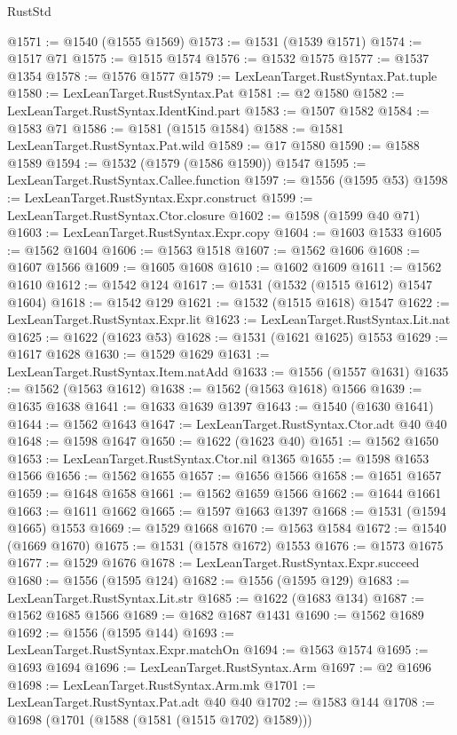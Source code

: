 \begin{lexlean}{RustStd}
\begin{coremodule}
@1571 := @1540 (@1555 @1569)
@1573 := @1531 (@1539 @1571)
@1574 := @1517 @71
@1575 := @1515 @1574
@1576 := @1532 @1575
@1577 := @1537 @1354
@1578 := @1576 @1577
@1579 := LexLeanTarget.RustSyntax.Pat.tuple
@1580 := LexLeanTarget.RustSyntax.Pat
@1581 := @2 @1580
@1582 := LexLeanTarget.RustSyntax.IdentKind.part
@1583 := @1507 @1582
@1584 := @1583 @71
@1586 := @1581 (@1515 @1584)
@1588 := @1581 LexLeanTarget.RustSyntax.Pat.wild
@1589 := @17 @1580
@1590 := @1588 @1589
@1594 := @1532 (@1579 (@1586 @1590)) @1547
@1595 := LexLeanTarget.RustSyntax.Callee.function
@1597 := @1556 (@1595 @53)
@1598 := LexLeanTarget.RustSyntax.Expr.construct
@1599 := LexLeanTarget.RustSyntax.Ctor.closure
@1602 := @1598 (@1599 @40 @71)
@1603 := LexLeanTarget.RustSyntax.Expr.copy
@1604 := @1603 @1533
@1605 := @1562 @1604
@1606 := @1563 @1518
@1607 := @1562 @1606
@1608 := @1607 @1566
@1609 := @1605 @1608
@1610 := @1602 @1609
@1611 := @1562 @1610
@1612 := @1542 @124
@1617 := @1531 (@1532 (@1515 @1612) @1547 @1604)
@1618 := @1542 @129
@1621 := @1532 (@1515 @1618) @1547
@1622 := LexLeanTarget.RustSyntax.Expr.lit
@1623 := LexLeanTarget.RustSyntax.Lit.nat
@1625 := @1622 (@1623 @53)
@1628 := @1531 (@1621 @1625) @1553
@1629 := @1617 @1628
@1630 := @1529 @1629
@1631 := LexLeanTarget.RustSyntax.Item.natAdd
@1633 := @1556 (@1557 @1631)
@1635 := @1562 (@1563 @1612)
@1638 := @1562 (@1563 @1618) @1566
@1639 := @1635 @1638
@1641 := @1633 @1639 @1397
@1643 := @1540 (@1630 @1641)
@1644 := @1562 @1643
@1647 := LexLeanTarget.RustSyntax.Ctor.adt @40 @40
@1648 := @1598 @1647
@1650 := @1622 (@1623 @40)
@1651 := @1562 @1650
@1653 := LexLeanTarget.RustSyntax.Ctor.nil @1365
@1655 := @1598 @1653 @1566
@1656 := @1562 @1655
@1657 := @1656 @1566
@1658 := @1651 @1657
@1659 := @1648 @1658
@1661 := @1562 @1659 @1566
@1662 := @1644 @1661
@1663 := @1611 @1662
@1665 := @1597 @1663 @1397
@1668 := @1531 (@1594 @1665) @1553
@1669 := @1529 @1668
@1670 := @1563 @1584
@1672 := @1540 (@1669 @1670)
@1675 := @1531 (@1578 @1672) @1553
@1676 := @1573 @1675
@1677 := @1529 @1676
@1678 := LexLeanTarget.RustSyntax.Expr.succeed
@1680 := @1556 (@1595 @124)
@1682 := @1556 (@1595 @129)
@1683 := LexLeanTarget.RustSyntax.Lit.str
@1685 := @1622 (@1683 @134)
@1687 := @1562 @1685 @1566
@1689 := @1682 @1687 @1431
@1690 := @1562 @1689
@1692 := @1556 (@1595 @144)
@1693 := LexLeanTarget.RustSyntax.Expr.matchOn
@1694 := @1563 @1574
@1695 := @1693 @1694
@1696 := LexLeanTarget.RustSyntax.Arm
@1697 := @2 @1696
@1698 := LexLeanTarget.RustSyntax.Arm.mk
@1701 := LexLeanTarget.RustSyntax.Pat.adt @40 @40
@1702 := @1583 @144
@1708 := @1698 (@1701 (@1588 (@1581 (@1515 @1702) @1589)))

\end{coremodule}
\end{lexlean}
